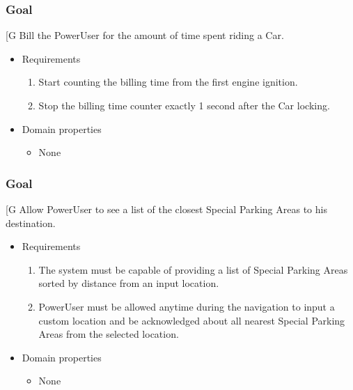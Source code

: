    \subsubsection{Goal }
    {[}G\arabic{goalctr}{]}
	Bill the PowerUser for the amount of time spent riding a Car.
    \begin{itemize}
        \item Requirements
        \begin{enumerate}[REQ]
                \item Start counting the billing time from the first engine ignition.
    	        \item Stop the billing time counter exactly 1 second after the Car locking.
        \end{enumerate}
        \item Domain properties
        \begin{itemize}
    			\item None
        \end{itemize}
    \end{itemize}

    \subsubsection{Goal }
    {[}G\arabic{goalctr}{]}
    Allow PowerUser to see a list of the closest Special Parking Areas to his destination.
    \begin{itemize}
        \item Requirements
        \begin{enumerate}[REQ]
    		    \item The system must be capable of providing a list of Special Parking Areas sorted by distance from an input location.
			    \item PowerUser must be allowed anytime during the navigation to input a custom location and be acknowledged about all nearest Special Parking Areas from the selected location.
        \end{enumerate}
        \item Domain properties
        \begin{itemize}
    			\item None
        \end{itemize}
    \end{itemize}
    
